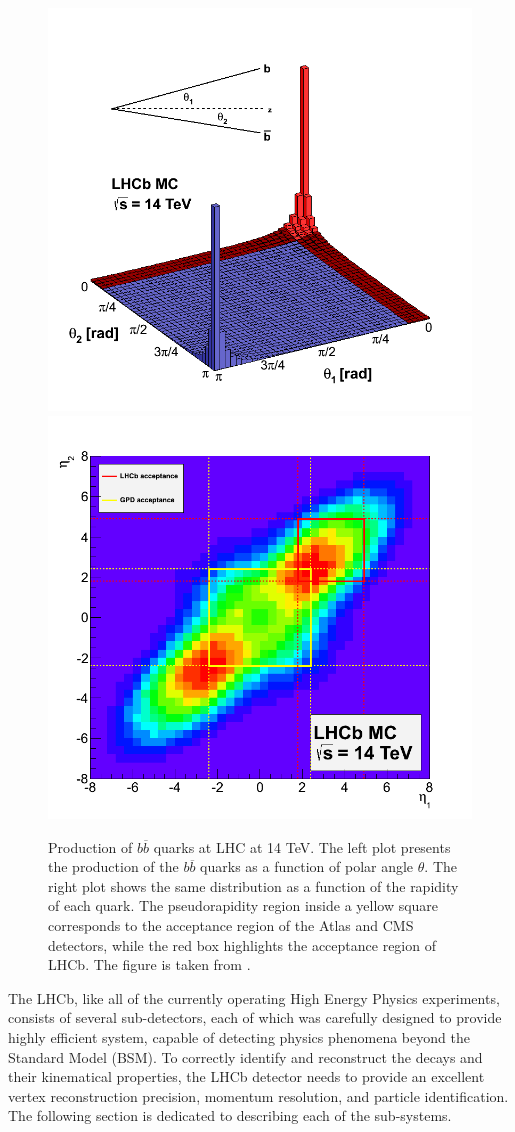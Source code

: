 \begin{figure}[h]
 \begin{center}
  \includegraphics[width=0.48\linewidth]{figures/bb_2.png}
   \includegraphics[width=0.48\linewidth]{figures/bb_1.png}
   \caption{Production of  $b \overline{b}$ quarks at LHC at 14 TeV. The left plot presents the production of the $b \overline{b}$ quarks as a function of polar angle $\theta$. The right plot shows the same distribution as a function of the rapidity of each quark. The pseudorapidity region inside a yellow square corresponds to the acceptance region of the Atlas and CMS detectors, while the red box highlights the acceptance region of LHCb. The figure is taken from \cite{bbangles}. 
     \label{fig:bb}}
 \end{center}
\end{figure}


The LHCb, like all of the currently operating High Energy Physics experiments, consists of several sub-detectors, each of which was carefully designed to provide highly efficient system, capable of detecting physics phenomena beyond the Standard Model (BSM). To correctly identify and reconstruct the decays and their kinematical properties, the LHCb detector needs to provide an excellent vertex reconstruction precision, momentum resolution, and particle identification. The following section is dedicated to describing each of the sub-systems.

